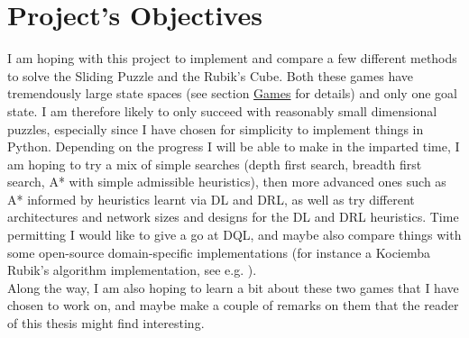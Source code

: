 

\section{Project's Objectives}

I am hoping with this project to implement and compare a few different methods to solve the Sliding Puzzle and the Rubik's Cube. Both these games have tremendously large state spaces (see section \hyperref[sec:Games]{Games} for details) and only one goal state. I am therefore likely to only succeed with reasonably small dimensional puzzles, especially since I have chosen for simplicity to implement things in Python.
Depending on the progress I will be able to make in the imparted time, I am hoping to try a mix of simple searches (depth first search, breadth first search, A* with simple admissible heuristics), then more advanced ones such as A* informed by heuristics learnt via DL and DRL, as well as try different architectures and network sizes and designs for the DL and DRL heuristics. Time permitting I would like to give a go at DQL, and maybe also compare things with some open-source domain-specific implementations (for instance a Kociemba Rubik's algorithm implementation, see e.g. \cite{Kociemba}).
\\
Along the way, I am also hoping to learn a bit about these two games that I have chosen to work on, and maybe make a couple of remarks on them that the reader of this thesis might find interesting.

